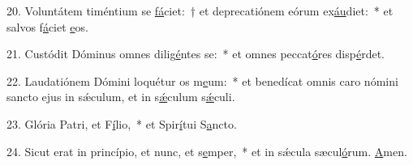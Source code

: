 20. Voluntátem timéntium se \uline{fá}ciet:~† et deprecatiónem eórum ex\uline{áu}diet:~* et salvos f\uline{á}ciet \uline{e}os.\par 
21. Custódit Dóminus omnes dilig\uline{é}ntes se:~* et omnes peccat\uline{ó}res disp\uline{é}rdet.\par 
22. Laudatiónem Dómini loquétur os m\uline{e}um:~* et benedícat omnis caro nómini sancto ejus in sǽculum, et in s\uline{ǽ}culum s\uline{ǽ}culi.\par 
23. Glória Patri, et F\uline{í}lio,~* et Spir\uline{í}tui S\uline{a}ncto.\par 
24. Sicut erat in princípio, et nunc, et s\uline{e}mper,~* et in sǽcula sæcul\uline{ó}rum. \uline{A}men.\par 
